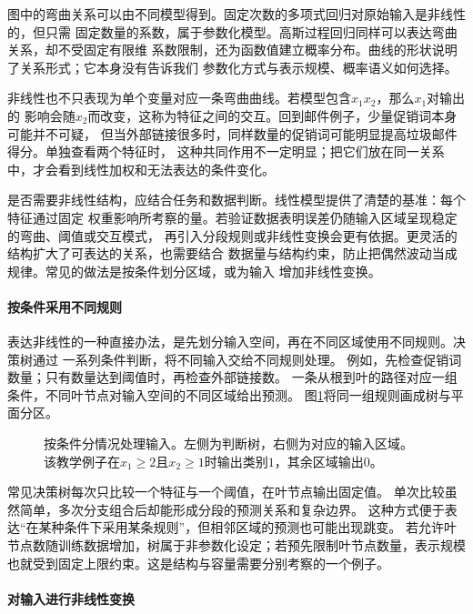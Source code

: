 图中的弯曲关系可以由不同模型得到。固定次数的多项式回归对原始输入是非线性的，但只需
固定数量的系数，属于参数化模型。高斯过程回归同样可以表达弯曲关系，却不受固定有限维
系数限制，还为函数值建立概率分布。曲线的形状说明了关系形式；它本身没有告诉我们
参数化方式与表示规模、概率语义如何选择。

非线性也不只表现为单个变量对应一条弯曲曲线。若模型包含$x_1x_2$，那么$x_1$对输出的
影响会随$x_2$而改变，这称为特征之间的交互。回到邮件例子，少量促销词本身可能并不可疑，
但当外部链接很多时，同样数量的促销词可能明显提高垃圾邮件得分。单独查看两个特征时，
这种共同作用不一定明显；把它们放在同一关系中，才会看到线性加权和无法表达的条件变化。

是否需要非线性结构，应结合任务和数据判断。线性模型提供了清楚的基准：每个特征通过固定
权重影响所考察的量。若验证数据表明误差仍随输入区域呈现稳定的弯曲、阈值或交互模式，
再引入分段规则或非线性变换会更有依据。更灵活的结构扩大了可表达的关系，也需要结合
数据量与结构约束，防止把偶然波动当成规律。常见的做法是按条件划分区域，或为输入
增加非线性变换。
\FloatBarrier

\paragraph{按条件采用不同规则}

表达非线性的一种直接办法，是先划分输入空间，再在不同区域使用不同规则。决策树通过
一系列条件判断，将不同输入交给不同规则处理。
例如，先检查促销词数量；只有数量达到阈值时，再检查外部链接数。
一条从根到叶的路径对应一组条件，不同叶节点对输入空间的不同区域给出预测。
图\ref{fig:models-tree-partition}将同一组规则画成树与平面分区。

\begin{figure}[htbp]
  \centering
  
  \caption{按条件分情况处理输入。左侧为判断树，右侧为对应的输入区域。
  该教学例子在$x_1\geq2$且$x_2\geq1$时输出类别$1$，其余区域输出$0$。}
  \label{fig:models-tree-partition}
\end{figure}

常见决策树每次只比较一个特征与一个阈值，在叶节点输出固定值。
单次比较虽然简单，多次分支组合后却能形成分段的预测关系和复杂边界。
这种方式便于表达“在某种条件下采用某条规则”，但相邻区域的预测也可能出现跳变。
若允许叶节点数随训练数据增加，树属于非参数化设定；若预先限制叶节点数量，表示规模
也就受到固定上限约束。这是结构与容量需要分别考察的一个例子。

\paragraph{对输入进行非线性变换}

